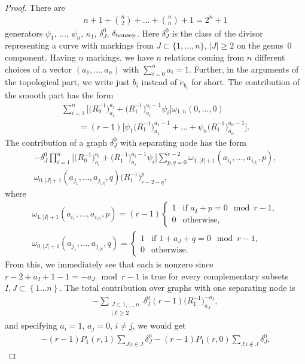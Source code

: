 \documentclass[pdftex]{sigma}
\numberwithin{equation}{section}
\begin{document}
\begin{proof}
 There are
 \begin{align*}
 n+1+\binom{n}{2}+\dots+\binom{n}{n}+1 = 2^n+1
 \end{align*}
 generators $\psi_1$, $\dots$, $\psi_n$, $\kappa_1$, $\delta^{0}_{J}$, $\delta_{\rm nonsep}$.
 Here $\delta^{0}_{J}$ is the class of the divisor representing a curve with markings from $J\subset \{1,\dots, n\}$, $|J|\geq 2$ on the genus~0 component.
Having $n$ markings, we have $n$ relations coming from $n$ different choices of a vector $(a_1,\dots,a_n)$ with $\sum^{n}_{i=0}a_i= 1$. Further, in the arguments of the topological part, we write just $b_i$ instead of $\widetilde{e}_{b_i}$ for short.
The contribution of the smooth part has the form
\begin{gather*}
\sum_{i=1}^{n}\big[\big(R^{-1}_{0}\big)^{a_i}_{a_i}+\big(R^{-1}_{1}\big)^{a_i-1}_{a_i}\psi_i\big]\omega_{1,n}(0,\dots,0)\\
\qquad=(r-1)\big[\psi_1 \big(R^{-1}_{1}\big)^{a_1-1}_{a_1}+\dots+\psi_n \big(R^{-1}_{1}\big)^{a_n-1}_{a_n}\big].
\end{gather*}
The contribution of a graph $\delta_J^0$ with separating node has the form
\begin{gather*}
-\delta^{0}_{J}\prod^{n}_{i=1}\big[\big(R^{-1}_{0}\big)^{a_i}_{a_i}+\big(R^{-1}_{1}\big)^{a_i-1}_{a_i}\psi_i\big]\sum^{r-2}_{p,q=0}\omega_{1, |I|+1}(a_{i_1},\dots,a_{i_{|I|}},p),\\
\omega_{0, |J|+1}(a_{j_1},\dots,a_{j_{|J|}},q)\big(R^{-1}_{1}\big)^{p}_{r-2-q},
\end{gather*}
where
\begin{gather*}
\omega_{1, |I|+1}(a_{i_1},\dots,a_{i_{|I|}},p) = (r-1)
\begin{cases}
1 & \text{if } a_I+p = 0 \mod r-1,\\
0 & \text{otherwise},
\end{cases}
\\
\omega_{0, |J|+1}(a_{j_1},\dots,a_{j_{|J|}},q) =
\begin{cases}
1 & \text{if } 1+a_J+q = 0 \mod r-1 ,\\
0 & \text{otherwise} .
\end{cases}
 \end{gather*}
From this, we immediately see that each
is nonzero since $r-2+a_I+1-1 = -a_J \mod r-1$ is true for every complementary subsets $I,J\subset \left\{1\dots n\right\}$. The total contribution over graphs with one separating node is
\begin{align*}
-\sum_{\substack{J\subset {1,\dots,n}\\|J|\geq 2}} \delta^{0}_{J}(r-1)\big(R^{-1}_{1}\big)^{-a_I}_{a_J},
\end{align*}
and specifying $a_i = 1$, $a_j = 0$, $i\neq j$, we would get
\begin{align*}
-(r-1)P_1(r,1)\sum_{J| i \in J} \delta^{0}_{J} -(r-1)P_1(r,0)\sum_{J| i \notin J} \delta^{0}_{J}.
\end{align*}


\end{proof}
\end{document}
